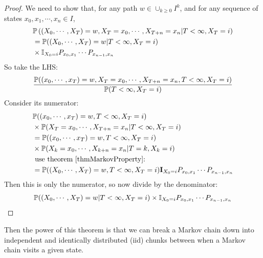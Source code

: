 \documentclass[../Main.tex]{subfiles}
\begin{document}
\begin{proof}
    We need to show that, for any path $w \in \cup_{k \geq 0} I^k$, and for any sequence of states $x_0, x_1, \cdots, x_n \in I$,
    \begin{align*}
        &\P\left((X_0, \cdots, X_T) = w, X_T = x_0, \cdots, X_{T+n} = x_n | T < \infty, X_T = i\right) \\
        &= \P((X_0 ,\cdots, X_T) = w | T < \infty, X_T = i) \\
        &\times \mathbb{I}_{X_0 = i} \Pmat{0}{1} \cdots \Pmat{n-1}{n} 
    \end{align*}
    So take the LHS:
    \begin{equation*}
        \frac{\P((x_0, \cdots, x_T) = w, X_T = x_0, \cdots, X_{T+n} = x_n, T < \infty, X_T = i)}{\P(T < \infty, X_T = i)}
    \end{equation*}
    Consider its numerator:
    \begin{align*}
        &\P((x_0, \cdots, x_T) = w, T < \infty, X_T = i) \\
        &\times \P(X_T = x_0, \cdots, X_{T+n} = x_n | T<\infty, X_T = i) \\
        &= \P((x_0, \cdots, x_T) = w, T < \infty, X_T = i) \\
        &\times \P(X_k = x_0, \cdots, X_{k+n} = x_n | T = k, X_k = i) \\
        &\text{ use theorem~\ref{thmMarkovProperty}:} \\
        &= \P((X_0, \cdots, X_T) = w, T < \infty, X_T = i) \textbf{I}_{X_0 = i} \Pmat{0}{1} \cdots \Pmat{n-1}{n}
    \end{align*}
    Then this is only the numerator, so now divide by the denominator:
    \begin{equation*}
        \P((X_0 ,\cdots, X_T) = w | T < \infty, X_T = i) \times \mathbb{I}_{X_0 = i} \Pmat{0}{1} \cdots \Pmat{n-1}{n} 
    \end{equation*}
\end{proof}
Then the power of this theorem is that we can break a Markov chain down into independent and identically distributed (iid) chunks between when a Markov chain visits a given state.
\end{document}
